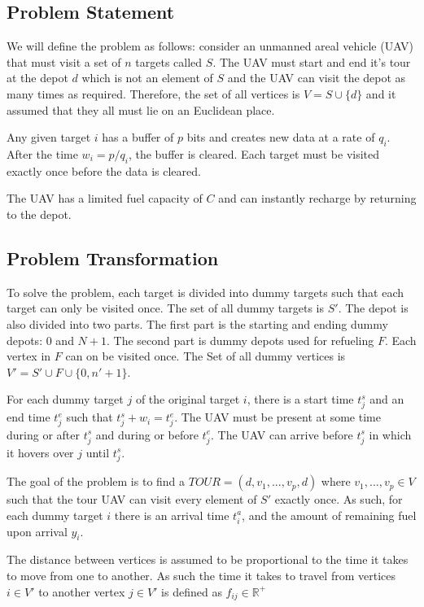 \subsection{Problem Statement}

We will define the problem as follows: consider an unmanned areal vehicle (UAV) that must visit a set of $n$ targets called $S$. The UAV must start and end it's tour at the depot $d$ which is not an element of $S$ and the UAV can visit the depot as many times as required. Therefore, the set of all vertices is $V=S\cup\{ d\}$ and it assumed that they all must lie on an Euclidean place. 

Any given target $i$ has a buffer of $p$ bits and creates new data at a rate of $q_i$. After the time $w_i=p/q_i$, the buffer is cleared. Each target must be visited exactly once before the data is cleared. 

The UAV has a limited fuel capacity of $C$ and can instantly recharge by returning to the depot.

\subsection{Problem Transformation}

To solve the problem, each target is divided into dummy targets such that each target can only be visited once. The set of all dummy targets is $S'$. The depot is also divided into two parts. The first part is the starting and ending dummy depots: $0$ and $N+1$. The second part is dummy depots used for refueling $F$. Each vertex in $F$ can on be visited once. The Set of all dummy vertices is $V'=S'\cup F\cup\{0,n'+1\}$.

For each dummy target $j$ of the original target $i$, there is a start time $t^s_j$ and an end time $t^e_j$ such that $t^s_j+w_i=t^e_j$. The UAV must be present at some time during or after $t^s_j$ and during or before $t^e_j$. The UAV can arrive before $t^s_j$ in which it hovers over $j$ until $t^s_j$. 

The goal of the problem is to find a $TOUR=(d,v_1,...,v_p,d)$ where $v_1,...,v_p\in V$ such that the tour UAV can visit every element of $S'$ exactly once. As such, for each dummy target $i$ there is an arrival time $t^a_i$, and the amount of remaining fuel upon arrival $y_i$.


The distance between vertices is assumed to be proportional to the time it takes to move from one to another. As such the time it takes to travel from vertices $i\in V'$ to another vertex $j\in V'$ is defined as $f_{ij}\in\mathbb{R}^+$ 

